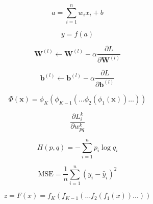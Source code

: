 \documentclass{article}
\begin{document}
\begin{tcolorbox}[colback=pastelblue, colframe=pastelblue]
\begin{equation}
    a = \sum_{i=1}^{n} w_i x_i + b
\end{equation}
\end{tcolorbox}

\begin{tcolorbox}[colback=pastelpurple, colframe=pastelpurple]
\begin{equation}
    y = f(a)
\end{equation}
\end{tcolorbox}

\begin{equation}
\mathbf{W}^{(l)} \leftarrow \mathbf{W}^{(l)} - \alpha \frac{\partial L}{\partial \mathbf{W}^{(l)}}
\end{equation}

\begin{equation}
\mathbf{b}^{(l)} \leftarrow \mathbf{b}^{(l)} - \alpha \frac{\partial L}{\partial \mathbf{b}^{(l)}}
\end{equation}

\begin{equation}
\Phi(\boldsymbol{x})=\phi_K(\phi_{K-1}(\dots \phi_2(\phi_1(\boldsymbol{x}))\dots))
\end{equation}

\begin{equation}
\frac{\partial L_i^{k}}{\partial w_{pq}^{k}}
\end{equation}

\begin{equation}
H(p,q) = - \sum_{i=1}^{n} p_i \log q_i
\end{equation}

\begin{equation}
\text{MSE} = \frac{1}{n} \sum_{i=1}^{n} (y_i - \hat{y}_i)^2
\end{equation}

\begin{equation}
z = F(x) = f_K(f_{K-1}(\dots f_2(f_1(x))\dots))
\end{equation}
\end{document}

